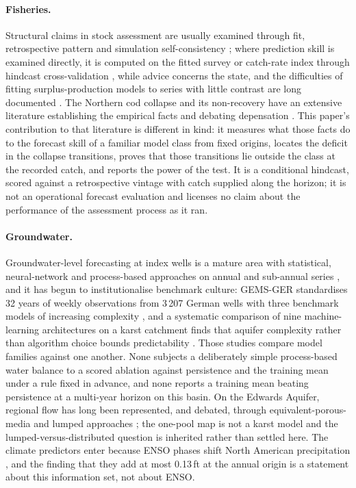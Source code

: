 \documentclass[preprint,11pt,authoryear]{elsarticle}
\theoremstyle{definition}
\theoremstyle{remark}
\begin{document}
\paragraph{Fisheries.} Structural claims in stock assessment are usually examined through fit, retrospective pattern and simulation self-consistency \citep{HilbornWalters1992,Punt2016,Maunder2015}; where prediction skill is examined directly, it is computed on the fitted survey or catch-rate index through hindcast cross-validation \citep{Kell2016,Kell2021,Carvalho2021,Kokkalis2024}, while advice concerns the state, and the difficulties of fitting surplus-production models to series with little contrast are long documented \citep{HilbornWalters1992,LudwigWalters1985,Polacheck1993,Punt2003,PedersenBerg2017}. The Northern cod collapse and its non-recovery have an extensive literature establishing the empirical facts \citep{Hutchings1994,Myers1997,Walters1996,Hutchings2005,RoseRowe2015,RoseWalters2019,Rose2026} and debating depensation \citep{Shelton1999,Hutchings1996,Myers1995,Liermann1997}. This paper's contribution to that literature is different in kind: it measures what those facts do to the forecast skill of a familiar model class from fixed origins, locates the deficit in the collapse transitions, proves that those transitions lie outside the class at the recorded catch, and reports the power of the test. It is a conditional hindcast, scored against a retrospective vintage with catch supplied along the horizon; it is not an operational forecast evaluation and licenses no claim about the performance of the assessment process as it ran.

\paragraph{Groundwater.} Groundwater-level forecasting at index wells is a mature area with statistical, neural-network and process-based approaches on annual and sub-annual series \citep{Daliakopoulos2005,AdamowskiChan2011}, and it has begun to institutionalise benchmark culture: GEMS-GER standardises 32 years of weekly observations from 3\,207 German wells with three benchmark models of increasing complexity \citep{Ohmer2026}, and a systematic comparison of nine machine-learning architectures on a karst catchment finds that aquifer complexity rather than algorithm choice bounds predictability \citep{Zhu2026}. Those studies compare model families against one another. None subjects a deliberately simple process-based water balance to a scored ablation against persistence and the training mean under a rule fixed in advance, and none reports a training mean beating persistence at a multi-year horizon on this basin. On the Edwards Aquifer, regional flow has long been represented, and debated, through equivalent-porous-media and lumped approaches \citep{Scanlon2003}; the one-pool map is not a karst model and the lumped-versus-distributed question is inherited rather than settled here. The climate predictors enter because ENSO phases shift North American precipitation \citep{Ropelewski1986}, and the finding that they add at most 0.13\,ft at the annual origin is a statement about this information set, not about ENSO.
\end{document}
